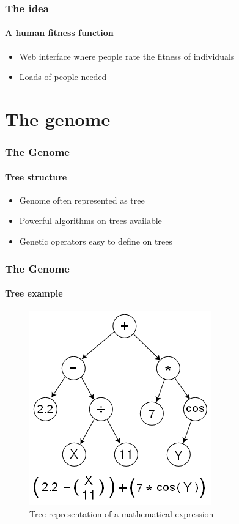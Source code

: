 \documentclass{beamer}
\begin{document}
\begin{frame}
	\frametitle{The idea}
	\framesubtitle{A human fitness function}
	\begin{itemize}
		\item<1-> Web interface where people rate the fitness of individuals
		\item<2-> Loads of people needed
	\end{itemize}
	
\end{frame}



\section{The genome} %
\label{sg:sec:the_genome}

\begin{frame}
	\frametitle{The Genome}
	\framesubtitle{Tree structure}
	\begin{itemize}
		\item<1-> Genome often represented as tree
		\item<2-> Powerful algorithms on trees available
		\item<3-> Genetic operators easy to define on trees
	\end{itemize}
\end{frame}

\begin{frame}
	\frametitle{The Genome}
	\framesubtitle{Tree example}
	\begin{figure}[h]
		\centering
			\includegraphics[width=0.6\textheight]{images/Genetic_Program_Tree.png}
		\caption{Tree representation of a mathematical expression}
		\label{sg:fig:images_Genetic_Program_Tree}
	\end{figure}
\end{frame}
\end{document}
